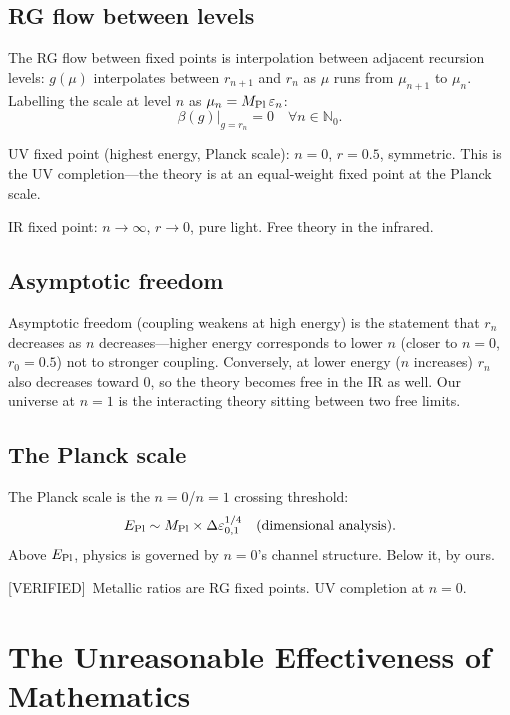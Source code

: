 \documentclass[prd,twocolumn,preprintnumbers,amsmath,amssymb]{revtex4-2}
\newcommand{\verified}{\textcolor{green!60!black}{[VERIFIED]}}
\begin{document}
\subsection{RG flow between levels}

The RG flow between fixed points is interpolation between adjacent
recursion levels: $g(\mu)$ interpolates between $r_{n+1}$ and $r_n$
as $\mu$ runs from $\mu_{n+1}$ to $\mu_n$.  Labelling the scale at
level $n$ as $\mu_n = M_{\rm Pl}\,\varepsilon_n$:
\begin{equation}
  \beta(g)\big|_{g=r_n} = 0
  \quad \forall n \in \mathbb{N}_0.
  \label{eq:RGinterp}
\end{equation}

UV fixed point (highest energy, Planck scale): $n=0$, $r=0.5$,
symmetric.  This is the UV completion---the theory is at an
equal-weight fixed point at the Planck scale.

IR fixed point: $n\to\infty$, $r\to 0$, pure light.  Free theory
in the infrared.

\subsection{Asymptotic freedom}

Asymptotic freedom (coupling weakens at high energy) is the
statement that $r_n$ decreases as $n$ decreases---higher energy
corresponds to lower $n$ (closer to $n=0$, $r_0=0.5$) not to
stronger coupling.  Conversely, at lower energy ($n$ increases)
$r_n$ also decreases toward 0, so the theory becomes free in the
IR as well.  Our universe at $n=1$ is the interacting theory sitting
between two free limits.

\subsection{The Planck scale}

The Planck scale is the $n=0$/$n=1$ crossing threshold:
\begin{equation}
  E_{\rm Pl} \sim M_{\rm Pl} \times \Delta\varepsilon_{0,1}^{1/4}
    \quad (\text{dimensional analysis}).
  \label{eq:EPl}
\end{equation}
Above $E_{\rm Pl}$, physics is governed by $n=0$'s channel structure.
Below it, by ours.

\verified\ Metallic ratios are RG fixed points.  UV completion at $n=0$.

\section{The Unreasonable Effectiveness of Mathematics}
\label{sec:math}
\end{document}

